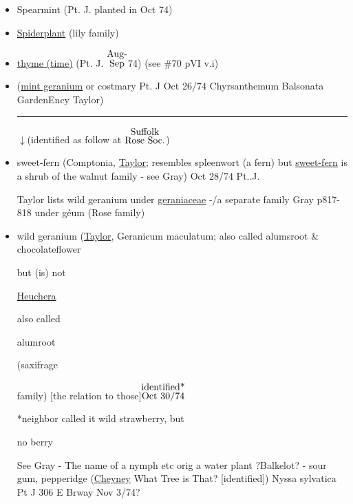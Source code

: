 \documentclass[a4paper,10pt]{article}
\begin{document}
\begin{flushleft}
\begin{itemize}
{{\begin{minipage}{0.5in}
        How great fallen are the great L.Z.
    \end{minipage}
    }
    }
\begin{turn}{25}\usebox{\abc}\end{turn}
\color{blue}
\normalsize
Oct 18/74
\small
\color{red}
John Parkinson 1629 \ul{Paradisus Terrestis} ``The rarity \& novelty of this herb, being for the most part but in the gardens of great persons, doth cause it to be of great regard"
\color{blue}
\normalsize
\item Spearmint (Pt. J. planted in Oct 74)
\item \ul{Spiderplant} (lily family)
\item \ul{thyme (time)} (Pt. J. {$\stackrel{\hbox{Aug-}}{\hbox{Sep}}$}74) (see \#70 pVI v.i)
\item (\ul{mint geranium} or costmary Pt. J Oct 26/74 
Chyrsanthemum Balsonata GardenEncy Taylor)
\rule{10cm}{0.01cm}
\begin{flushright}
$\downarrow$(identified as follow at {$\stackrel{\hbox{Suffolk}}{\hbox{Rose Soc.}}$})
\end{flushright}
\item sweet-fern (Comptonia, \ul{Taylor}; resembles spleenwort (a fern) but \ul{sweet-fern} is a shrub of the walnut family - see Gray)
Oct 28/74 Pt..J.\par
\color{red}
\footnotesize
Taylor lists wild geranium under \ul{geraniaceae} -/a separate family 
Gray p817-818 %
under g\'eum (Rose family)
\color{blue}
\normalsize
\item wild geranium (\ul{Taylor}, Geranicum maculatum; also called alumsroot \& chocolateflower\par
\color{red}
but (is) not\par
\ul{Heuchera}\par
also called\par
 alumroot\par
(saxifrage\par
family)
\color{blue}
[the relation to those]{$\stackrel{\hbox{identified*}}{\hbox{Oct 30/74}}$}\par
*neighbor called it wild strawberry, but\par 
no berry\par
See Gray - The name of a nymph etc orig a water plant 
?Balkelot? - sour gum, pepperidge \color{red} (\ul{Cheyney} What Tree is That? [identified])
\color{blue}Nyssa sylvatica Pt J 306 E Brway Nov 3/74?



\end{itemize}
\end{flushleft}
\end{document}
